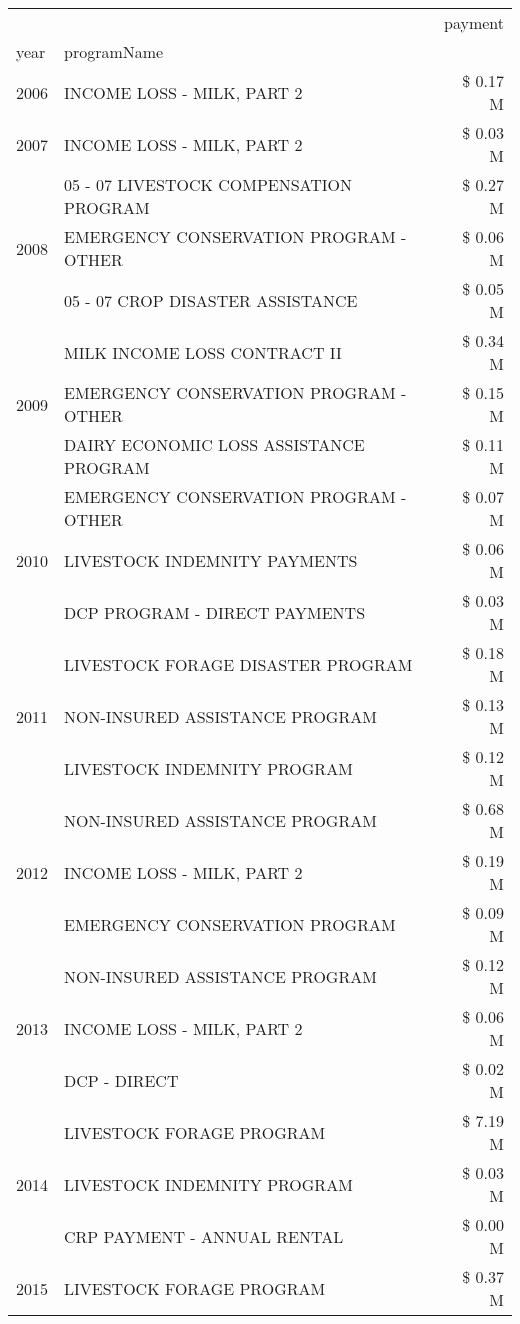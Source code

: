 \begin{tabular}{llr}
\toprule
 &  & payment \\
year & programName &  \\
\midrule
2006 & INCOME LOSS - MILK, PART 2 & \$ 0.17 M \\
\cline{1-3}
2007 & INCOME LOSS - MILK, PART 2 & \$ 0.03 M \\
\cline{1-3}
\multirow[t]{3}{*}{2008} & 05 - 07 LIVESTOCK COMPENSATION PROGRAM & \$ 0.27 M \\
 & EMERGENCY CONSERVATION PROGRAM - OTHER & \$ 0.06 M \\
 & 05 - 07 CROP DISASTER ASSISTANCE & \$ 0.05 M \\
\cline{1-3}
\multirow[t]{3}{*}{2009} & MILK INCOME LOSS CONTRACT II & \$ 0.34 M \\
 & EMERGENCY CONSERVATION PROGRAM - OTHER & \$ 0.15 M \\
 & DAIRY ECONOMIC LOSS ASSISTANCE PROGRAM & \$ 0.11 M \\
\cline{1-3}
\multirow[t]{3}{*}{2010} & EMERGENCY CONSERVATION PROGRAM - OTHER & \$ 0.07 M \\
 & LIVESTOCK INDEMNITY PAYMENTS & \$ 0.06 M \\
 & DCP PROGRAM - DIRECT PAYMENTS & \$ 0.03 M \\
\cline{1-3}
\multirow[t]{3}{*}{2011} & LIVESTOCK FORAGE DISASTER PROGRAM & \$ 0.18 M \\
 & NON-INSURED ASSISTANCE PROGRAM & \$ 0.13 M \\
 & LIVESTOCK INDEMNITY PROGRAM & \$ 0.12 M \\
\cline{1-3}
\multirow[t]{3}{*}{2012} & NON-INSURED ASSISTANCE PROGRAM & \$ 0.68 M \\
 & INCOME LOSS - MILK, PART 2 & \$ 0.19 M \\
 & EMERGENCY CONSERVATION PROGRAM & \$ 0.09 M \\
\cline{1-3}
\multirow[t]{3}{*}{2013} & NON-INSURED ASSISTANCE PROGRAM & \$ 0.12 M \\
 & INCOME LOSS - MILK, PART 2 & \$ 0.06 M \\
 & DCP - DIRECT & \$ 0.02 M \\
\cline{1-3}
\multirow[t]{3}{*}{2014} & LIVESTOCK FORAGE PROGRAM & \$ 7.19 M \\
 & LIVESTOCK INDEMNITY PROGRAM & \$ 0.03 M \\
 & CRP PAYMENT - ANNUAL RENTAL & \$ 0.00 M \\
\cline{1-3}
\multirow[t]{3}{*}{2015} & LIVESTOCK FORAGE PROGRAM & \$ 0.37 M \\

\end{tabular}
